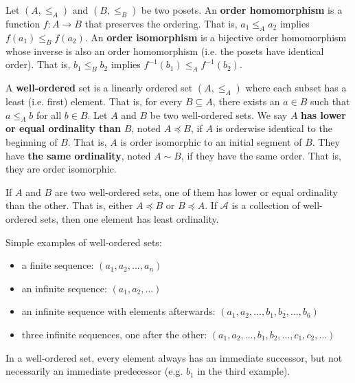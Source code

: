 \documentclass{article}
\newcommand{\marginleft}[1] {\reversemarginpar\marginpar{#1}}
\def\ordleq{\preceq}
\def\ordeq{\sim}
\begin{document}
\begin{defn}
	Let $(A, \leq_A)$ \marginleft{Order homo/ \\ isomorphism} and $(B, \leq_B)$ be two posets. An \textbf{order homomorphism} is a function $f : A \to B$ that preserves the ordering. That is, $a_1 \leq_A a_2$ implies $f(a_1) \leq_B f(a_2)$. An \textbf{order isomorphism} is a bijective order homomorphism whose inverse is also an order homomorphism (i.e. the posets have identical order). That is, $b_1 \leq_B b_2$ implies $f^{-1}(b_1) \leq_A f^{-1}(b_2)$.
\end{defn}

\begin{defn}
	A \textbf{well-ordered} \marginleft{Well-order} set is a linearly ordered set $(A, \leq_A)$ where each subset has a least (i.e. first) element. That is, for every $B \subseteq A$, there exists an $a \in B$ such that $a \leq_A b$ for all $b \in B$. Let $A$ and $B$ be two well-ordered sets. We say $A$ \textbf{has lower or equal ordinality than} $B$, noted $A \ordleq B$, if $A$ is orderwise identical to the beginning of $B$. That is, $A$ is order isomorphic to an initial segment of $B$. They have \textbf{the same ordinality}, noted $A \ordeq B$, if they have the same order. That is, they are order isomorphic.
\end{defn}

\begin{prop}[Ordinality]
	If $A$ and $B$ are two well-ordered sets, one of them has lower or equal ordinality than the other. That is, either $A \ordleq B$ or $B \ordleq A$. If $\mathcal{A}$ is a collection of well-ordered sets, then one element has least ordinality.
\end{prop}

\begin{remark}
	Simple examples of well-ordered sets:
	\begin{itemize}
		\item a finite sequence: $(a_1, a_2, ..., a_n)$
		\item an infinite sequence: $(a_1, a_2, ...)$
		\item an infinite sequence with elements afterwards: $(a_1, a_2, ..., b_1, b_2, ... , b_6)$
		\item three infinite sequences, one after the other: $(a_1, a_2, ..., b_1, b_2, ... , c_1, c_2, ...)$
	\end{itemize}
	In a well-ordered set, every element always has an immediate successor, but not necessarily an immediate predecessor (e.g. $b_1$ in the third example).
\end{remark}
\end{document}
